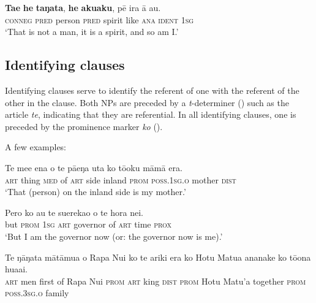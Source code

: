 \ea\label{ex:9.8}
\gll \textbf{Ta{\ꞌ}e} \textbf{he} \textbf{taŋata}, \textbf{he} \textbf{{\ꞌ}aku{\ꞌ}aku}, pē ira {\ꞌ}ā au. \\
\textsc{conneg} \textsc{pred} person \textsc{pred} spirit like \textsc{ana} \textsc{ident} \textsc{1sg} \\

\glt 
‘That is not a man, it is a spirit, and so am I.’ \textstyleExampleref{[Mtx-7-04.058]}
\z
{}

\subsection{Identifying clauses}\label{sec:9.2.2}
Identifying clauses serve to identify the referent of one  with the referent of the other  in the clause. Both NPs are preceded by a \textit{t}{}-determiner () such as the article \textit{te}, indicating that they are referential. In all identifying clauses, one  is preceded by the prominence marker \textit{ko} (). 

A few examples:

\ea\label{ex:9.9}
\gll Te me{\ꞌ}e ena o te pā{\ꞌ}eŋa {\ꞌ}uta ko tō{\ꞌ}oku māmā era. \\
\textsc{art} thing \textsc{med} of \textsc{art} side inland \textsc{prom} \textsc{poss.1sg.o} mother \textsc{dist} \\

\glt 
‘That (person) on the inland side is my mother.’ \textstyleExampleref{[R411.057]} 
\z

\ea\label{ex:9.10}
\gll Pero ko au te suerekao o te hora nei. \\
but \textsc{prom} \textsc{1sg} \textsc{art} governor of \textsc{art} time \textsc{prox} \\

\glt 
‘But I am the governor now (or: the governor now is me).’ \textstyleExampleref{[R201.007]} 
\z

\ea\label{ex:9.11}
\gll Te ŋāŋata mātāmu{\ꞌ}a o Rapa Nui ko te {\ꞌ}ariki era ko Hotu Matu{\ꞌ}a  ananake ko tō{\ꞌ}ona hua{\ꞌ}ai.\\
\textsc{art} men first of Rapa Nui \textsc{prom} \textsc{art} king \textsc{dist} \textsc{prom} Hotu Matu’a  together \textsc{prom} \textsc{poss.3sg.o} family\\

